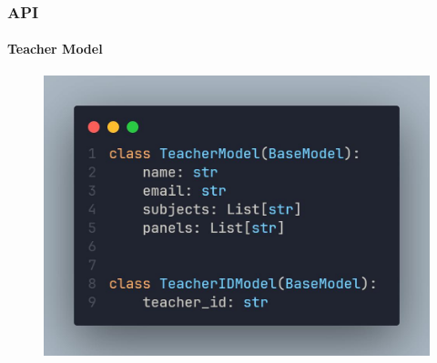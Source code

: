 \documentclass[aspectratio=169]{beamer}
\begin{document}
\begin{frame}
	\centering
	\frametitle{API}
	\framesubtitle{Teacher Model}
	\begin{minipage}{0.95\textwidth}
		\begin{figure}[H]
			\centering
			\includegraphics[width=.95\textwidth]{teacher.jpg}
		\end{figure}
	\end{minipage}
\end{frame}
\end{document}
